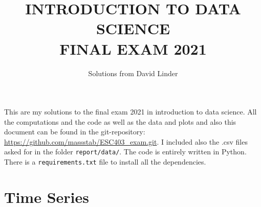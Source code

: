 \documentclass[]{article}
\title{\textbf{\normalsize INTRODUCTION TO DATA SCIENCE \\ \Large FINAL EXAM 2021}}
\author{Solutions from David Linder}
\begin{document}
	\maketitle
	\thispagestyle{fancy}
	This are my solutions to the final exam 2021 in introduction to data science. All the computations and the code as well as the data and plots and also this document can be found in the git-repository: \href{https://github.com/massstab/ESC403_exam.git}{https://github.com/massstab/ESC403\_exam.git}. I included also the .csv files asked for in the folder \texttt{report/data/}. The code is entirely written in Python. There is a \texttt{requirements.txt} file to install all the dependencies.
	\section{Time Series}
\end{document}
